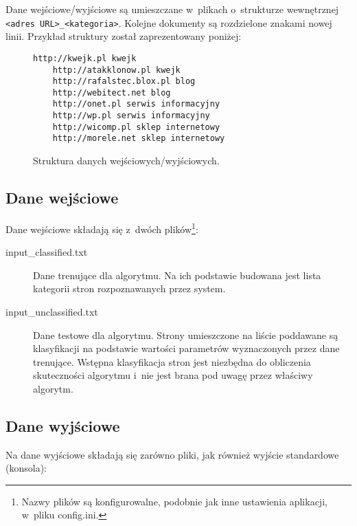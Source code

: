 \documentclass[a4paper,11pt]{article}
\begin{document}
Dane wejściowe/wyjściowe są umieszczane w~plikach o~strukturze wewnętrznej \verb+<adres URL>_<kategoria>+. Kolejne dokumenty są rozdzielone znakami nowej linii. Przykład struktury został zaprezentowany poniżej:

\begin{figure}[ht!]
    \begin{Verbatim}[frame=single]
    http://kwejk.pl kwejk
    http://atakklonow.pl kwejk
    http://rafalstec.blox.pl blog
    http://webitect.net blog
    http://onet.pl serwis informacyjny
    http://wp.pl serwis informacyjny
    http://wicomp.pl sklep internetowy
    http://morele.net sklep internetowy
    \end{Verbatim}
    \caption{Struktura danych wejściowych/wyjściowych.}
    \label{fig:input_output_structure}
\end{figure}

\subsection{Dane wejściowe}

Dane wejściowe składają się z~dwóch plików\footnote{Nazwy plików są konfigurowalne, podobnie jak inne ustawienia aplikacji, w~pliku config.ini.}:

\begin{description}
    \item[input\_classified.txt] Dane trenujące dla algorytmu. Na ich podstawie budowana jest lista kategorii stron rozpoznawanych przez system.
    \item[input\_unclassified.txt] Dane testowe dla algorytmu. Strony umieszczone na liście poddawane są klasyfikacji na podstawie wartości parametrów wyznaczonych przez dane trenujące. Wstępna klasyfikacja stron jest niezbędna do obliczenia skuteczności algorytmu i~nie jest brana pod uwagę przez właściwy algorytm.
\end{description}

\subsection{Dane wyjściowe}

Na dane wyjściowe składają się zarówno pliki, jak również wyjście standardowe (konsola):
\end{document}
